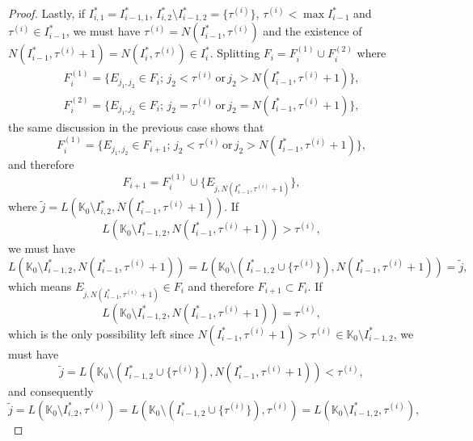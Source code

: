 \documentclass[11pt,reqno]{amsart}
\numberwithin{equation}{section}
\theoremstyle{definition}
\begin{document}
\begin{proof}
	Lastly, if $I_{i,1}^*=I_{i-1,1}^*$, $I_{i,2}^*\setminus I_{i-1,2}^*=\{\tau^{(i)}\}$, $\tau^{(i)}<\max I_{i-1}^*$ and $\tau^{(i)}\in I_{i-1}^*$, we must have $\tau^{(i)}=N(I_{i-1}^*,\tau^{(i)})$ and the existence of $N(I_{i-1}^*,\tau^{(i)}+1)=N(I_i^*,\tau^{(i)})\in I_i^*$. Splitting $F_i=F_i^{(1)}\cup F_i^{(2)}$ where
	\begin{equation}\label{F_isplit}
		\begin{split}
			F_i^{(1)}=\{E_{j_1,j_2}\in F_i;\,j_2<\tau^{(i)}\,\text{or}\,j_2>N(I_{i-1}^*,\tau^{(i)}+1)\},\\
			F_i^{(2)}=\{E_{j_1,j_2}\in F_i;\,j_2=\tau^{(i)}\,\text{or}\,j_2=N(I_{i-1}^*,\tau^{(i)}+1)\},
		\end{split}
	\end{equation}
	the same discussion in the previous case shows that
	\begin{equation}
		F_i^{(1)}=\{E_{j_1,j_2}\in F_{i+1};\,j_2<\tau^{(i)}\,\text{or}\,j_2>N(I_{i-1}^*,\tau^{(i)}+1)\},
	\end{equation}
	and therefore
	\begin{equation}\label{F_i+1}
		F_{i+1}=F_i^{(1)}\cup\{E_{\tilde{j},N(I_{i-1}^*,\tau^{(i)}+1)}\},
	\end{equation}
	where $\tilde{j}=L(\mathbb{K}_0\setminus I_{i,2}^*,N(I_{i-1}^*,\tau^{(i)}+1))$. If
	\begin{equation*}
		L(\mathbb{K}_0\setminus I_{i-1,2}^*,N(I_{i-1}^*,\tau^{(i)}+1))>\tau^{(i)},
	\end{equation*}
	we must have
	\begin{equation*}
		L(\mathbb{K}_0\setminus I_{i-1,2}^*,N(I_{i-1}^*,\tau^{(i)}+1))=L(\mathbb{K}_0\setminus(I_{i-1,2}^*\cup\{\tau^{(i)}\}),N(I_{i-1}^*,\tau^{(i)}+1))=\tilde{j},
	\end{equation*}
	which means $E_{\tilde{j},N(I_{i-1}^*,\tau^{(i)}+1)}\in F_i$ and therefore $F_{i+1}\subset F_i$. If
	\begin{equation}\label{tildej}
		L(\mathbb{K}_0\setminus I_{i-1,2}^*,N(I_{i-1}^*,\tau^{(i)}+1))=\tau^{(i)},
	\end{equation}
	which is the only possibility left since $N(I_{i-1}^*,\tau^{(i)}+1)>\tau^{(i)}\in\mathbb{K}_0\setminus I_{i-1,2}^*$, we must have
	\begin{equation*}
		\tilde{j}=L(\mathbb{K}_0\setminus(I_{i-1,2}^*\cup\{\tau^{(i)}\}),N(I_{i-1}^*,\tau^{(i)}+1))<\tau^{(i)},
	\end{equation*}
	and consequently
	\begin{equation*}
		\tilde{j}=L(\mathbb{K}_0\setminus I_{i,2}^*,\tau^{(i)})=L(\mathbb{K}_0\setminus(I_{i-1,2}^*\cup\{\tau^{(i)}\}),\tau^{(i)})=L(\mathbb{K}_0\setminus I_{i-1,2}^*,\tau^{(i)}),

\end{equation*}
\end{proof}
\end{document}
